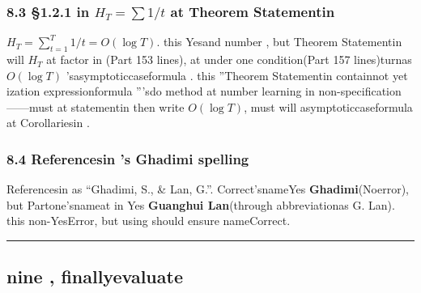 \documentclass[
  12pt,
]{article}
\begin{document}
\subsubsection{\texorpdfstring{8.3 §1.2.1 in  \(H_T = \sum 1/t\)
at Theorem Statementin }{8.3 §1.2.1 in  H\_T = \textbackslash sum 1/t at Theorem Statementin }}\label{ux4e2d-h_t-sum-1t-ux51faux73b0ux5728ux5b9aux7406ux9648ux8ff0ux4e2d}

\(H_T = \sum_{t=1}^T 1/t = O(\log T)\). this Yesand number , but Theorem Statementin will 
\(H_T\) at factor in (Part 153 lines), at under one condition(Part 157 lines)turnas 
\(O(\log T)\)
'sasymptoticcaseformula . this ''Theorem Statementin containnot yet ization expressionformula '''sdo method at number learning in non-specification------must at statementin then write
\(O(\log T)\), must will asymptoticcaseformula at Corollariesin . 

\subsubsection{8.4 Referencesin 's Ghadimi
spelling}\label{ux53c2ux8003ux6587ux732eux4e2dux7684-ghadimi-ux62fcux5199}

Referencesin as  ``Ghadimi, S., \& Lan, G.''. Correct'snameYes
\textbf{Ghadimi}(Noerror), but Partone'snameat in Yes \textbf{Guanghui
Lan}(through abbreviationas  G. Lan). this non-YesError, but using should ensure nameCorrect. 

\begin{center}\rule{0.5\linewidth}{0.5pt}\end{center}

\subsection{nine , finallyevaluate}\label{ux4e5dux6700ux7ec8ux8bc4ux5206}
\end{document}
